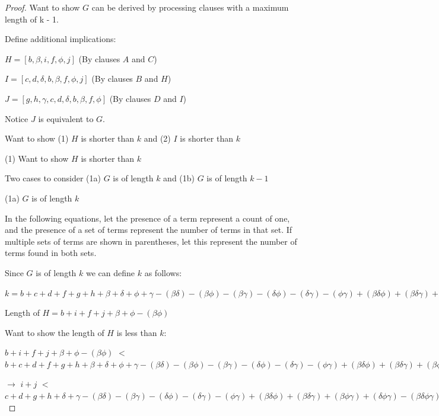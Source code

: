 \documentclass[manuscript]{acmart}
\begin{document}
\begin{proof}
        Want to show $G$ can be derived by processing clauses with a 
        maximum length of k - 1.

        Define additional implications:

        $H = [b, \beta, i, f, \phi, j]$ (By clauses $A$ and $C$)

        $I = [c, d, \delta, b, \beta, f, \phi, j]$ (By clauses $B$ and $H$)

        $J = [g, h, \gamma, c, d, \delta, b, \beta, f, \phi]$ (By clauses $D$ and $I$)

        Notice $J$ is equivalent to $G$.

        Want to show (1) $H$ is shorter than $k$ and (2) $I$ is shorter than $k$

        (1) Want to show $H$ is shorter than $k$

        Two cases to consider (1a) $G$ is of length $k$ and (1b) $G$ is of length $k - 1$

        (1a) $G$ is of length $k$

        In the following equations, let the presence of a term represent a count of one,
        and the presence of a set of terms represent the number of terms in that set. If
        multiple sets of terms are shown in parentheses, let this represent the number
        of terms found in both sets.

        Since $G$ is of length $k$ we can define $k$ as follows:

        $k = b + c + d + f + g + h
            + \beta + \delta + \phi + \gamma
            - (\beta \delta) - (\beta \phi) - (\beta \gamma) - (\delta \phi) - (\delta \gamma) -(\phi \gamma)
            + (\beta \delta \phi) + (\beta \delta \gamma) + (\beta \phi \gamma) + (\delta \phi \gamma)
            - (\beta \delta \phi \gamma)
        $

        Length of $H = b + i + f + j + \beta + \phi - (\beta \phi)$
        
        Want to show the length of $H$ is less than $k$:

        $b + i + f + j + \beta + \phi - (\beta \phi)$
        $<$
        $b + c + d + f + g + h
            + \beta + \delta + \phi + \gamma
            - (\beta \delta) - (\beta \phi) - (\beta \gamma) - (\delta \phi) - (\delta \gamma) -(\phi \gamma)
            + (\beta \delta \phi) + (\beta \delta \gamma) + (\beta \phi \gamma) + (\delta \phi \gamma)
            - (\beta \delta \phi \gamma)
        $

        $\rightarrow$
        $i + j$
        $<$
        $c + d + g + h
            + \delta + \gamma
            - (\beta \delta) - (\beta \gamma) - (\delta \phi) - (\delta \gamma) -(\phi \gamma)
            + (\beta \delta \phi) + (\beta \delta \gamma) + (\beta \phi \gamma) + (\delta \phi \gamma)
            - (\beta \delta \phi \gamma)
        $


\end{proof}
\end{document}
